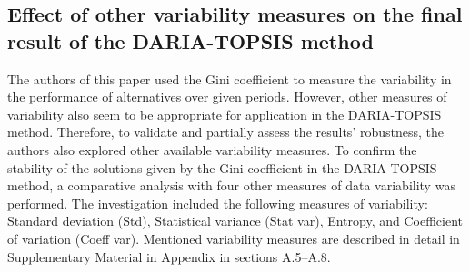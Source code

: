 \documentclass[final,5p,times,twocolumn,authoryear]{elsarticle}
\begin{document}
\subsection{Effect of other variability measures on the final result of the DARIA-TOPSIS method}
\label{sec:ResultsBenchmarkVarMeasures}

The authors of this paper used the Gini coefficient to measure the variability in the performance of alternatives over given periods. However, other measures of variability also seem to be appropriate for application in the DARIA-TOPSIS method. Therefore, to validate and partially assess the results' robustness, the authors also explored other available variability measures. To confirm the stability of the solutions given by the Gini coefficient in the DARIA-TOPSIS method, a comparative analysis with four other measures of data variability was performed. The investigation included the following measures of variability: Standard deviation (Std), Statistical variance (Stat var), Entropy, and Coefficient of variation (Coeff var). Mentioned variability measures are described in detail in Supplementary Material in Appendix in sections A.5--A.8.
\end{document}
